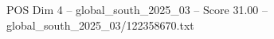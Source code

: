 \begin{textsample}{POS Dim 4 – global\_south\_2025\_03 – Score 31.00 – global\_south\_2025\_03/122358670.txt}
\end{textsample}
